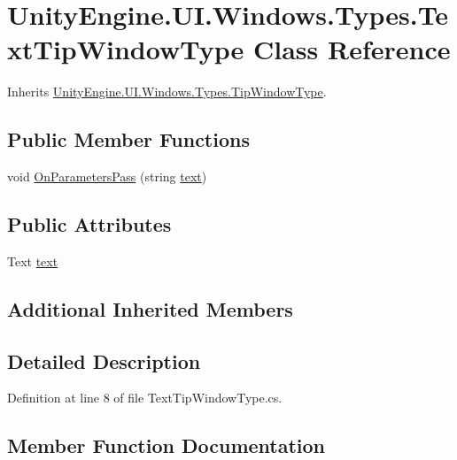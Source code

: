 \hypertarget{class_unity_engine_1_1_u_i_1_1_windows_1_1_types_1_1_text_tip_window_type}{}\section{Unity\+Engine.\+U\+I.\+Windows.\+Types.\+Text\+Tip\+Window\+Type Class Reference}
\label{class_unity_engine_1_1_u_i_1_1_windows_1_1_types_1_1_text_tip_window_type}


Inherits \hyperlink{class_unity_engine_1_1_u_i_1_1_windows_1_1_types_1_1_tip_window_type}{Unity\+Engine.\+U\+I.\+Windows.\+Types.\+Tip\+Window\+Type}.

\subsection*{Public Member Functions}
\begin{DoxyCompactItemize}
\item 
void \hyperlink{class_unity_engine_1_1_u_i_1_1_windows_1_1_types_1_1_text_tip_window_type_a46d51cb4a6fe80599bb469f8aa0da6e4}{On\+Parameters\+Pass} (string \hyperlink{class_unity_engine_1_1_u_i_1_1_windows_1_1_types_1_1_text_tip_window_type_afd68c900dc8fa4dde881dd65b006fd12}{text})
\end{DoxyCompactItemize}
\subsection*{Public Attributes}
\begin{DoxyCompactItemize}
\item 
Text \hyperlink{class_unity_engine_1_1_u_i_1_1_windows_1_1_types_1_1_text_tip_window_type_afd68c900dc8fa4dde881dd65b006fd12}{text}
\end{DoxyCompactItemize}
\subsection*{Additional Inherited Members}


\subsection{Detailed Description}


Definition at line 8 of file Text\+Tip\+Window\+Type.\+cs.



\subsection{Member Function Documentation}
\hypertarget{class_unity_engine_1_1_u_i_1_1_windows_1_1_types_1_1_text_tip_window_type_a46d51cb4a6fe80599bb469f8aa0da6e4}{}
